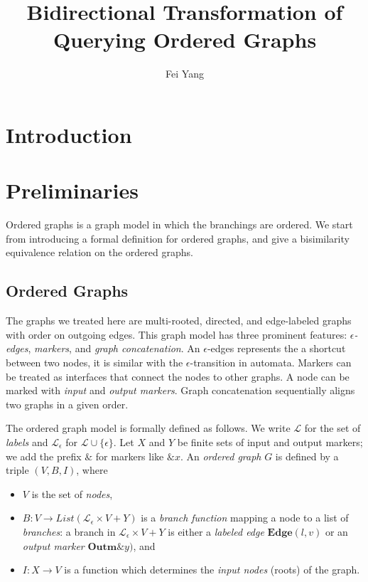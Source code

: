 \documentclass{llncs}
\title{Bidirectional Transformation of Querying Ordered Graphs}
\author{Fei Yang}
\institute
{ BASICS\\
  Department of Computer Science and Engineering\\
  Shanghai Jiao Tong University, P.R.China\\
  \email{iamyf@sjtu.edu.cn}
}
\begin{document}
\maketitle

\section{Introduction}\label{sec:intro}

\section{Preliminaries}\label{sec:pre}

Ordered graphs is a graph model in which the branchings are ordered. We start from introducing a formal definition for ordered graphs, and give a bisimilarity equivalence relation on the ordered graphs.

\subsection{Ordered Graphs}\label{subsec:order-graph}

The graphs we treated here are multi-rooted, directed, and edge-labeled graphs with order on outgoing edges. This graph model has three prominent features: \emph{$\epsilon$-edges}, \emph{markers}, and \emph{graph concatenation}. An $\epsilon$-edges represents the a shortcut between two nodes, it is similar with the $\epsilon$-transition in automata. Markers can be treated as interfaces that connect the nodes to other graphs. A node can be marked with \emph{input} and \emph{output markers}. Graph concatenation sequentially aligns two graphs in a given order.

The ordered graph model is formally defined as follows. We write $\mathcal{L}$ for the set of \emph{labels} and $\mathcal{L}_{\epsilon}$ for $\mathcal{L}\cup\{\epsilon\}$. Let $X$ and $Y$ be finite sets of input and output markers; we add the prefix $\&$ for markers like $\& x$.
    An \emph{ordered graph} $G$ is defined by a triple $(V,B,I)$, where
    \begin{itemize}
        \item $V$ is the set of \emph{nodes},
        \item $B:V\rightarrow List(\mathcal{L}_{\epsilon}\times V+Y)$ is a \emph{branch function} mapping a node to a list of \emph{branches}: a branch in $\mathcal{L}_{\epsilon}\times V+Y$ is either a \emph{labeled edge} $\mathbf{Edge}(l,v)$ or an \emph{output marker} $\mathbf{Outm}\&y)$, and
        \item $I:X \rightarrow V$ is a function which determines the \emph{input nodes} (roots) of the graph.
    \end{itemize}
\end{document}
